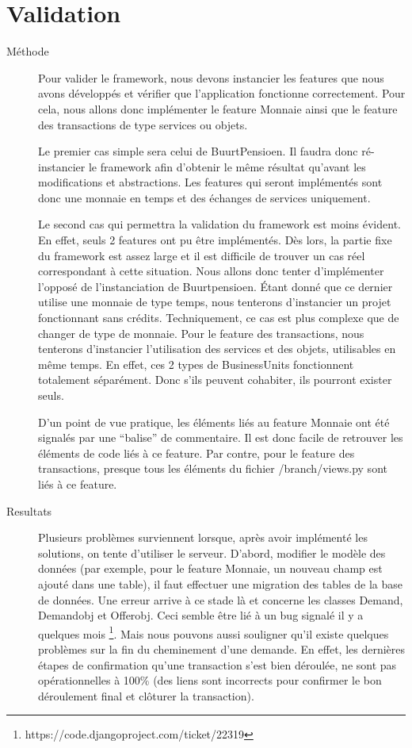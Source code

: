 \section{Validation}

\begin{description}

\item[Méthode]  Pour valider le framework,  nous devons instancier les features que nous avons développés et vérifier que l'application fonctionne correctement.  Pour cela,  nous allons donc implémenter le feature Monnaie ainsi que le feature des transactions de type services ou objets.  

Le premier cas simple sera celui de BuurtPensioen.  Il faudra donc ré-instancier le framework afin d'obtenir le même résultat qu'avant les modifications et abstractions.  Les features qui seront implémentés sont donc une monnaie en temps et des échanges de services uniquement.  

Le second cas qui permettra la validation du framework est moins évident.  En effet,  seuls 2 features ont pu être implémentés.  Dès lors,  la partie fixe du framework est assez large et il est difficile de trouver un cas réel correspondant à cette situation.  Nous allons donc tenter d'implémenter l'opposé de l'instanciation de Buurtpensioen.  Étant donné que ce dernier utilise une monnaie de type temps,  nous tenterons d'instancier un projet fonctionnant sans crédits.  Techniquement,  ce cas est plus complexe que de changer de type de monnaie.  Pour le feature des transactions,  nous tenterons d'instancier l'utilisation des services et des objets,  utilisables en même temps.  En effet,  ces 2 types de BusinessUnits fonctionnent totalement séparément.  Donc s'ils peuvent cohabiter,  ils pourront exister seuls.

D'un point de vue pratique,  les éléments liés au feature Monnaie ont été signalés par une ``balise'' de commentaire.  Il est donc facile de retrouver les éléments de code liés à ce feature.  Par contre,  pour le feature des transactions,  presque tous les éléments du fichier /branch/views.py sont liés à ce feature.  

\item[Resultats] Plusieurs problèmes surviennent lorsque,  après avoir implémenté les solutions,  on tente d'utiliser le serveur.  D'abord,  modifier le modèle des données (par exemple,  pour le feature Monnaie,  un nouveau champ est ajouté dans une table),  il faut effectuer une migration des tables de la base de données.  Une erreur arrive à ce stade là et concerne les classes Demand,  Demandobj et Offerobj.  Ceci semble être lié à un bug signalé il y a quelques mois \footnote{https://code.djangoproject.com/ticket/22319}.  Mais nous pouvons aussi souligner qu'il existe quelques problèmes sur la fin du cheminement d'une demande.  En effet,  les dernières étapes de confirmation qu'une transaction s'est bien déroulée,  ne sont pas opérationnelles à 100\% (des liens sont incorrects pour confirmer le bon déroulement final et clôturer la transaction).


\end{description}
